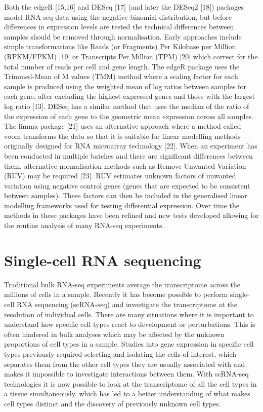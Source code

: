 \documentclass[11pt,a4paper,titlepage,twoside,openright]{style/unimelbthesis}
\theoremstyle{definition}
\theoremstyle{definition}
\theoremstyle{definition}
\theoremstyle{remark}
\begin{document}
\begin{mainmatter}
Both the edgeR {[}15,16{]} and DESeq {[}17{]} (and later the DESeq2 {[}18{]}) packages model RNA-seq data using the negative binomial distribution, but before differences in expression levels are tested the technical differences between samples should be removed through normalisation. Early approaches include simple transformations like Reads (or Fragments) Per Kilobase per Million (RPKM/FPKM) {[}19{]} or Transcripts Per Million (TPM) {[}20{]} which correct for the total number of reads per cell and gene length. The edgeR package uses the Trimmed-Mean of M values (TMM) method where a scaling factor for each sample is produced using the weighted mean of log ratios between samples for each gene, after excluding the highest expressed genes and those with the largest log ratio {[}13{]}. DESeq has a similar method that uses the median of the ratio of the expression of each gene to the geometric mean expression across all samples. The limma package {[}21{]} uses an alternative approach where a method called voom transforms the data so that it is suitable for linear modelling methods originally designed for RNA microarray technology {[}22{]}. When an experiment has been conducted in multiple batches and there are significant differences between them, alternative normalisation methods such as Remove Unwanted Variation (RUV) may be required {[}23{]}. RUV estimates unknown factors of unwanted variation using negative control genes (genes that are expected to be consistent between samples). These factors can then be included in the generalised linear modelling frameworks used for testing differential expression. Over time the methods in these packages have been refined and new tests developed allowing for the routine analysis of many RNA-seq experiments.

\hypertarget{intro-scRNAseq}{%
\section{Single-cell RNA sequencing}\label{intro-scRNAseq}}

Traditional bulk RNA-seq experiments average the transcriptome across the millions of cells in a sample. Recently it has become possible to perform single-cell RNA sequencing (scRNA-seq) and investigate the transcriptome at the resolution of individual cells. There are many situations where it is important to understand how specific cell types react to development or perturbations. This is often hindered in bulk analyses which may be affected by the unknown proportions of cell types in a sample. Studies into gene expression in specific cell types previously required selecting and isolating the cells of interest, which separates them from the other cell types they are usually associated with and makes it impossible to investigate interactions between them. With scRNA-seq technologies it is now possible to look at the transcriptome of all the cell types in a tissue simultaneously, which has led to a better understanding of what makes cell types distinct and the discovery of previously unknown cell types.


\end{mainmatter}
\end{document}
